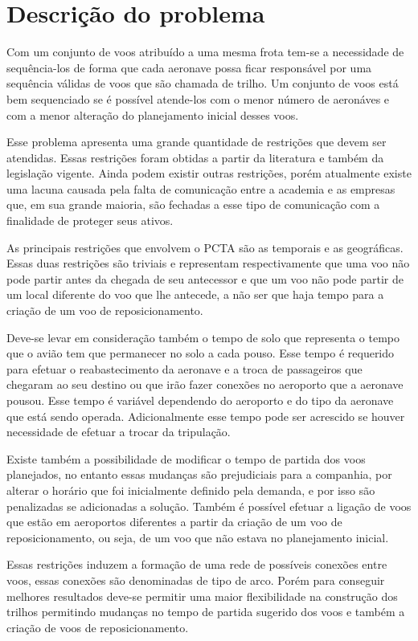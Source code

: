 \chapter{Descrição do problema}\label{cap:descprob}

Com um conjunto de voos atribuído a uma mesma frota tem-se a necessidade de
sequência-los de forma que cada aeronave possa ficar responsável por uma
sequência válidas de voos que são chamada de trilho. Um conjunto de voos está
bem sequenciado se é possível atende-los com o menor número de aeronáves e com a
menor alteração do planejamento inicial desses voos.
 
Esse problema apresenta uma grande quantidade de restrições que devem ser
atendidas. Essas restrições foram obtidas a partir da literatura e também da
legislação vigente. Ainda podem existir outras restrições, porém
atualmente existe uma lacuna causada pela falta de comunicação entre a
academia e as empresas que, em sua grande maioria, são fechadas a esse tipo de
comunicação com a finalidade de proteger seus ativos.

As principais restrições que envolvem o PCTA são as temporais e as geográficas.
Essas duas restrições são triviais e representam respectivamente que uma voo não
pode partir antes da chegada de seu antecessor e que um voo não pode partir de
um local diferente do voo que lhe antecede, a não ser que haja tempo para a
criação de um voo de reposicionamento. 

Deve-se levar em consideração também o
tempo de solo que representa o tempo que o avião tem que permanecer no solo a
cada pouso. Esse tempo é requerido para efetuar o reabastecimento da aeronave e a
troca de passageiros que chegaram ao seu destino ou que irão fazer conexões no
aeroporto que a aeronave pousou. Esse tempo é variável dependendo do
aeroporto e do tipo da aeronave que está sendo operada. Adicionalmente esse
tempo pode ser acrescido se houver necessidade de efetuar a trocar da
tripulação.

Existe também a possibilidade de modificar o tempo de partida dos voos
planejados, no entanto essas mudanças são prejudiciais para a companhia, por
alterar o horário que foi inicialmente definido pela demanda, e por isso são
penalizadas se adicionadas a solução. Também é possível efetuar a ligação de
voos que estão em aeroportos diferentes a partir da criação de um voo de
reposicionamento, ou seja, de um voo que não estava no planejamento
inicial.

Essas restrições induzem a formação de uma rede de possíveis conexões entre
voos, essas conexões são denominadas de tipo de arco. Porém para conseguir
melhores resultados deve-se permitir uma maior flexibilidade na construção dos
trilhos permitindo mudanças no tempo de partida sugerido dos voos e
também a criação de voos de reposicionamento.

